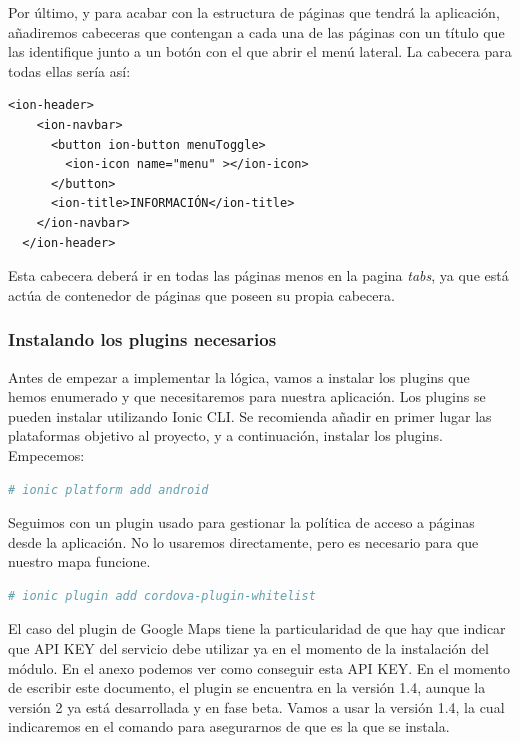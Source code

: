 Por último, y para acabar con la estructura de páginas que tendrá la aplicación, añadiremos cabeceras que contengan a cada una de las páginas con un título que las identifique junto a un botón con el que abrir el menú lateral. La cabecera para todas ellas sería así:

\begin{lstlisting}[style=htmlcssjs,frame=tlrb,xleftmargin={0.2cm}]
  <ion-header>
    <ion-navbar>
      <button ion-button menuToggle>
        <ion-icon name="menu" ></ion-icon>
      </button>
      <ion-title>INFORMACIÓN</ion-title>
    </ion-navbar>
  </ion-header>
\end{lstlisting}

Esta cabecera deberá ir en todas las páginas menos en la pagina \emph{tabs}, ya que está actúa de contenedor de páginas que poseen su propia cabecera.

\subsubsection{Instalando los plugins necesarios}

Antes de empezar a implementar la lógica, vamos a instalar los plugins que hemos enumerado y que necesitaremos para nuestra aplicación. Los plugins se pueden instalar utilizando Ionic CLI. Se recomienda añadir en primer lugar las plataformas objetivo al proyecto, y a continuación, instalar los plugins. Empecemos:

\begin{lstlisting}[language=bash]
  # ionic platform add android
\end{lstlisting}

Seguimos con un plugin usado para gestionar la política de acceso a páginas desde la aplicación. No lo usaremos directamente, pero es necesario para que nuestro mapa funcione.

\begin{lstlisting}[language=bash]
  # ionic plugin add cordova-plugin-whitelist
\end{lstlisting}

El caso del plugin de Google Maps tiene la particularidad de que hay que indicar que API KEY del servicio debe utilizar ya en el momento de la instalación del módulo. En el anexo  podemos ver como conseguir esta API KEY. En el momento de escribir este documento, el plugin se encuentra en la versión 1.4, aunque la versión 2 ya está desarrollada y en fase beta. Vamos a usar la versión 1.4, la cual indicaremos en el comando para asegurarnos de que es la que se instala.


